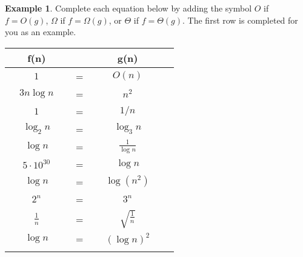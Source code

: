 \documentclass[10pt]{article}
\theoremstyle{definition}
\newtheorem{example}{Example}
\begin{document}
\newpage
\begin{example}
    Complete each equation below by adding the symbol $O$ if $f=O(g)$, $\Omega$ if $f=\Omega(g)$, or $\Theta$ if $f=\Theta(g)$.  
    The first row is completed for you as an example.

{\renewcommand{\arraystretch}{4.4}
\begin{tabular}{c c c c c c}
    & f(n) &~\hspace{0.5in}~$ $~\hspace{0.5in}~& g(n) &\\
    \hline
    & $1$ & ~\hspace{0.5in}~$=$~\hspace{0.5in}~  & $O(n)$ &  &\\
    \arrayrulecolor{gray}\hline
    & $3 n\log n$ & ~\hspace{0.5in}~$=$~\hspace{0.5in}~  & $n^2$ &  &\\
    \arrayrulecolor{gray}\hline
    & $1$ & ~\hspace{0.5in}~$=$~\hspace{0.5in}~  & $1/n$ &  &\\
    \arrayrulecolor{gray}\hline
    & $\log_2 n$ & ~\hspace{0.5in}~$=$~\hspace{0.5in}~  & $\log_3 n$ &  &\\
    \arrayrulecolor{gray}\hline
    & $\log n$ & ~\hspace{0.5in}~$=$~\hspace{0.5in}~  & $\frac {1} {\log n}$ &  &\\
    \arrayrulecolor{gray}\hline
    & $5\cdot10^{30}$ & ~\hspace{0.5in}~$=$~\hspace{0.5in}~  & $\log n$ &  &\\
    \arrayrulecolor{gray}\hline
    & $\log n$ & ~\hspace{0.5in}~$=$~\hspace{0.5in}~  & $\log (n^2)$ &  &\\
    \arrayrulecolor{gray}\hline
    & $2^n$ & ~\hspace{0.5in}~$=$~\hspace{0.5in}~  & $3^n$ &  &\\
    \arrayrulecolor{gray}\hline
    & $\frac 1 n$ & ~\hspace{0.5in}~$=$~\hspace{0.5in}~  & $\sqrt{\frac 1 n}$ &  &\\
    \arrayrulecolor{gray}\hline
    & $\log n$ & ~\hspace{0.5in}~$=$~\hspace{0.5in}~  & $(\log n)^2$ &  &\\
    \arrayrulecolor{gray}\hline


\end{tabular}}
\end{example}
\end{document}
